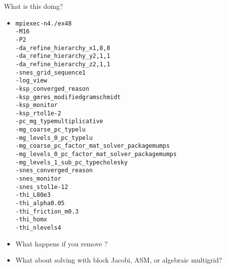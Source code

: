 \begin{frame}{What is this doing?}
\begin{itemize}
\item
\begin{alltt}\footnotesize
mpiexec -n 4 ./ex48
-M 16
-P 2 \bslash\\
-da\_refine\_hierarchy\_x 1,8,8 \bslash\\
-da\_refine\_hierarchy\_y 2,1,1
-da\_refine\_hierarchy\_z 2,1,1 \bslash\\
-snes\_grid\_sequence 1
-log\_view \bslash\\
-ksp\_converged\_reason
-ksp\_gmres\_modifiedgramschmidt \bslash\\
-ksp\_monitor
-ksp\_rtol 1e-2 \bslash\\
-pc\_mg\_type multiplicative \bslash\\
-mg\_coarse\_pc\_type lu
-mg\_levels\_0\_pc\_type lu \bslash\\
-mg\_coarse\_pc\_factor\_mat\_solver\_package mumps \bslash\\
-mg\_levels\_0\_pc\_factor\_mat\_solver\_package mumps \bslash\\
-mg\_levels\_1\_sub\_pc\_type cholesky \bslash\\
-snes\_converged\_reason
-snes\_monitor
-snes\_stol 1e-12 \bslash\\
-thi\_L 80e3
-thi\_alpha 0.05
-thi\_friction\_m 0.3 \bslash\\
-thi\_hom x
-thi\_nlevels 4
\end{alltt}
\item What happens if you remove ?
\item What about solving with block Jacobi, ASM, or algebraic multigrid?
\end{itemize}
\end{frame}
